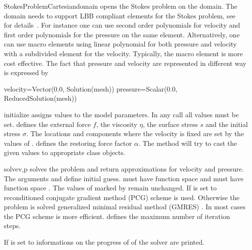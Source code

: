 \begin{classdesc}{StokesProblemCartesian}{domain}
opens the Stokes problem on the \Domain domain. The domain
needs to support LBB compliant elements for the Stokes problem, see~\cite{LBB} for details~.
For instance one can use second order polynomials for velocity and 
first order polynomials for the pressure on the same element. Alternatively, one can use 
macro elements using linear polynomial for both pressure and velocity    with a subdivided
element for the velocity. Typically, the macro element is more cost effective. The fact that pressure and velocity are represented in different way is expressed by
\begin{python}
velocity=Vector(0.0, Solution(mesh))
pressure=Scalar(0.0, ReducedSolution(mesh))
\end{python}
\end{classdesc}

\begin{methoddesc}[StokesProblemCartesian]{initialize}{}
assigns values to the model parameters. In any call all values must be set.
 defines the external force $f$,  the viscosity $\eta$,
 the surface stress $s$ and  the initial stress $\sigma$.
The locations and components where the velocity is fixed are set by 
the values of .  defines the restoring force factor $\alpha$. 
The method will try to cast the given values to appropriate 
\Data class objects.
\end{methoddesc}

\begin{methoddesc}[StokesProblemCartesian]{solve}{v,p
}
solves the problem and return approximations for velocity and pressure. 
The arguments  and  define initial guess.
 must have function space  and
 must have function space .
The values of  marked
by  remain unchanged. 
If  is set to \True 
reconditioned conjugate gradient method (PCG)   scheme is used. Otherwise the problem is solved generalized minimal residual method (GMRES) . In most cases 
the PCG scheme is more efficient.
 defines the maximum number of iteration steps. 

If  is set to \True informations on the progress of of the solver are printed.
\end{methoddesc}


